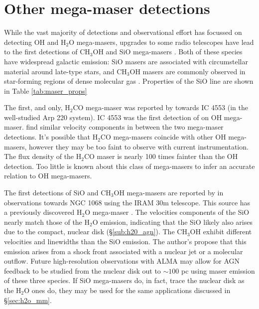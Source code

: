 \section{Other mega-maser detections}
\label{sec:other}

While the vast majority of detections and observational effort has focussed on detecting OH and H$_2$O mega-masers, upgrades to some radio telescopes have lead to the first detections of CH$_3$OH and SiO mega-masers \citep{wang2014_SiO_CH3OH, chen_methanol_2015}. Both of these species have widespread galactic emission: SiO masers are associated with circumstellar material around late-type stars, and CH$_3$OH masers are commonly observed in star-forming regions of dense molecular gas \citep{Elitzur_1992}. Properties of the SiO line are shown in Table \ref{tab:maser_props}

The first, and only, H$_2$CO mega-maser was reported by \citet{baan1986} towards IC 4553 (in the well-studied Arp 220 system). IC 4553 was the first detection of on OH mega-maser. \citet{baan1986} find similar velocity components in between the two mega-maser detections. It's possible that H$_2$CO mega-masers coincide with other OH mega-masers, however they may be too faint to observe with current instrumentation. The flux density of the H$_2$CO maser is nearly 100 times fainter than the OH detection. Too little is known about this class of mega-masers to infer an accurate relation to OH mega-masers.

The first detections of SiO and CH$_{3}$OH mega-masers are reported by \citet{wang2014_SiO_CH3OH} in observations towards NGC 1068 using the IRAM 30m telescope. This source has a previously discovered H$_2$O mega-maser \citep{Gallimore_2001}. The velocities components of the SiO nearly match those of the H$_2$O emission, indicating that the SiO likely also arises due to the compact, nuclear disk (\S\ref{sub:h20_agn}). The CH$_3$OH exhibit different velocities and linewidths than the SiO emission. The author's propose that this emission arises from a shock front associated with a nuclear jet or a molecular outflow. Future high-resolution observations with ALMA may allow for AGN feedback to be studied from the nuclear disk out to $\sim 100$ pc using maser emission of these three species. If SiO mega-masers do, in fact, trace the nuclear disk as the H$_2$O ones do, they may be used for the same applications discussed in \S\ref{sec:h2o_mm}. 

